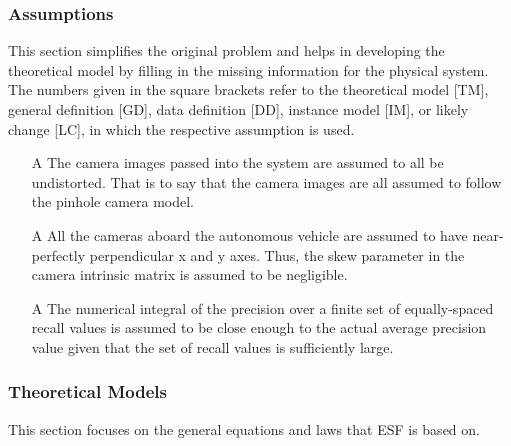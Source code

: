 \documentclass[12pt]{article}
\newcounter{assumpnum} %
\newcommand{\ProjectName}{ESF }
\begin{document}
\subsubsection{Assumptions} \label{sec_assumpt}

This section simplifies the original problem and helps in developing the
theoretical model by filling in the missing information for the physical system.
The numbers given in the square brackets refer to the theoretical model [TM],
general definition [GD], data definition [DD], instance model [IM], or likely
change [LC], in which the respective assumption is used.

\begin{itemize}

\item[A\refstepcounter{assumpnum}\theassumpnum \label{assump:distortion}] The camera images
passed into the system are assumed to all be undistorted. That is to say that the camera images
are all assumed to follow the pinhole camera model.

\item[A\refstepcounter{assumpnum}\theassumpnum \label{assump:skew}] All the cameras aboard the
autonomous vehicle are assumed to have near-perfectly perpendicular x and y axes. Thus, the skew parameter
in the camera intrinsic matrix is assumed to be negligible. 

\item[A\refstepcounter{assumpnum}\theassumpnum \label{assump:avgprec}] The numerical integral of the precision over
a finite set of equally-spaced recall values is assumed to be close enough to the actual average precision value given 
that the set of recall values is sufficiently large. 


\end{itemize}

\subsubsection{Theoretical Models}\label{sec_theoretical}

This section focuses on the general equations and laws that \ProjectName is based
on.


~\newline
\end{document}
